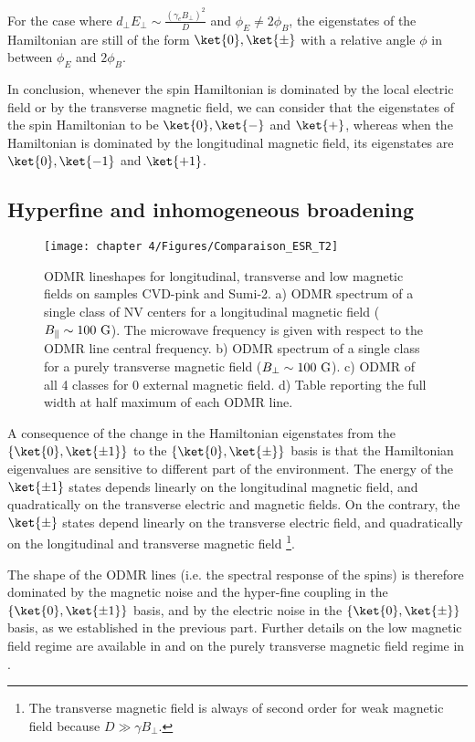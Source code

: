 \documentclass[a4paper, 11pt]{book}
\begin{document}
For the case where $d_\perp E_\perp \sim \frac{(\gamma_e B_\perp)^2}{D}$ and $\phi_E \neq 2\phi_B$, the eigenstates of the Hamiltonian are still of the form $\ket{0},\ket{\pm}$ with a relative angle $\phi$ in between $\phi_E$ and $2\phi_B$.

In conclusion, whenever the spin Hamiltonian is dominated by the local electric field or by the transverse magnetic field, we can consider that the eigenstates of the spin Hamiltonian to be $\ket{0}, \ket{-}$ and $\ket{+}$, whereas when the Hamiltonian is dominated by the longitudinal magnetic field, its eigenstates are $\ket{0}, \ket{-1}$ and $\ket{+1}$.

\subsection{Hyperfine and inhomogeneous broadening}
\label{sec modif T2*}
\begin{figure}[h]
\centering
\texttt{[image: chapter 4/Figures/Comparaison\_ESR\_T2]}
\caption{ODMR lineshapes for longitudinal, transverse and low magnetic fields on samples CVD-pink and Sumi-2. a) ODMR spectrum of a single class of NV centers for a longitudinal magnetic field ($B_\parallel \sim 100\ \rm G$). The microwave frequency is given with respect to the ODMR line central frequency. b) ODMR spectrum of a single class for a purely transverse magnetic field ($B_\perp \sim 100\ \rm G$). c) ODMR of all 4 classes for 0 external magnetic field. d) Table reporting the full width at half maximum of each ODMR line.}
\label{ESR for T2*}
\end{figure}

A consequence of the change in the Hamiltonian eigenstates from the $\{ \ket{0}, \ket{\pm 1} \}$ to the $\{ \ket{0}, \ket{\pm} \}$ basis is that the Hamiltonian eigenvalues are sensitive to different part of the environment. The energy of the $\ket{\pm 1}$ states depends linearly on the longitudinal magnetic field, and quadratically on the transverse electric and magnetic fields. On the contrary, the $\ket{\pm}$ states depend linearly on the transverse electric field, and quadratically on the longitudinal and transverse magnetic field \footnote{The transverse magnetic field is always of second order for weak magnetic field because $D\gg \gamma B_\perp$.}. 

The shape of the ODMR lines (i.e. the spectral response of the spins) is therefore dominated by the magnetic noise and the hyper-fine coupling in the $\{ \ket{0}, \ket{\pm 1} \}$ basis, and by the electric noise in the $\{ \ket{0}, \ket{\pm} \}$ basis, as we established in the previous part. Further details on the low magnetic field regime are available in \citep{jamonneau2016competition} and on the purely transverse magnetic field regime in \citep{qiu2021nuclear, qiu2022nanoscale}.
\end{document}
